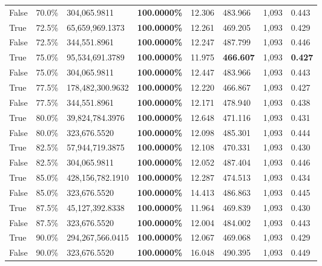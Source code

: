 \begin{table}[H]
\begin{tabular}{lllrllll}
\cline{1-8}
False & 70.0\% & \color{red} 304,065.9811 & \bfseries \color{red} 100.0000\% & 12.306 & 483.966 & 1,093 & 0.443 \\
\cline{1-8}
True & 72.5\% & 65,659,969.1373 & \bfseries \color{red} 100.0000\% & 12.261 & 469.205 & 1,093 & 0.429 \\
\cline{1-8}
False & 72.5\% & 344,551.8961 & \bfseries \color{red} 100.0000\% & 12.247 & 487.799 & 1,093 & 0.446 \\
\cline{1-8}
True & 75.0\% & 95,534,691.3789 & \bfseries \color{red} 100.0000\% & 11.975 & \bfseries \color{red} 466.607 & 1,093 & \bfseries \color{red} 0.427 \\
\cline{1-8}
False & 75.0\% & \color{red} 304,065.9811 & \bfseries \color{red} 100.0000\% & 12.447 & 483.966 & 1,093 & 0.443 \\
\cline{1-8}
True & 77.5\% & 178,482,300.9632 & \bfseries \color{red} 100.0000\% & 12.220 & 466.867 & 1,093 & 0.427 \\
\cline{1-8}
False & 77.5\% & 344,551.8961 & \bfseries \color{red} 100.0000\% & 12.171 & 478.940 & 1,093 & 0.438 \\
\cline{1-8}
True & 80.0\% & 39,824,784.3976 & \bfseries \color{red} 100.0000\% & 12.648 & 471.116 & 1,093 & 0.431 \\
\cline{1-8}
False & 80.0\% & 323,676.5520 & \bfseries \color{red} 100.0000\% & 12.098 & 485.301 & 1,093 & 0.444 \\
\cline{1-8}
True & 82.5\% & 57,944,719.3875 & \bfseries \color{red} 100.0000\% & 12.108 & 470.331 & 1,093 & 0.430 \\
\cline{1-8}
False & 82.5\% & \color{red} 304,065.9811 & \bfseries \color{red} 100.0000\% & 12.052 & 487.404 & 1,093 & 0.446 \\
\cline{1-8}
True & 85.0\% & 428,156,782.1910 & \bfseries \color{red} 100.0000\% & 12.287 & 474.513 & 1,093 & 0.434 \\
\cline{1-8}
False & 85.0\% & 323,676.5520 & \bfseries \color{red} 100.0000\% & 14.413 & 486.863 & 1,093 & 0.445 \\
\cline{1-8}
True & 87.5\% & 45,127,392.8338 & \bfseries \color{red} 100.0000\% & 11.964 & 469.839 & 1,093 & 0.430 \\
\cline{1-8}
False & 87.5\% & 323,676.5520 & \bfseries \color{red} 100.0000\% & 12.004 & 484.002 & 1,093 & 0.443 \\
\cline{1-8}
True & 90.0\% & 294,267,566.0415 & \bfseries \color{red} 100.0000\% & 12.067 & 469.068 & 1,093 & 0.429 \\
\cline{1-8}
False & 90.0\% & 323,676.5520 & \bfseries \color{red} 100.0000\% & 16.048 & 490.395 & 1,093 & 0.449 \\

\end{tabular}
\end{table}
